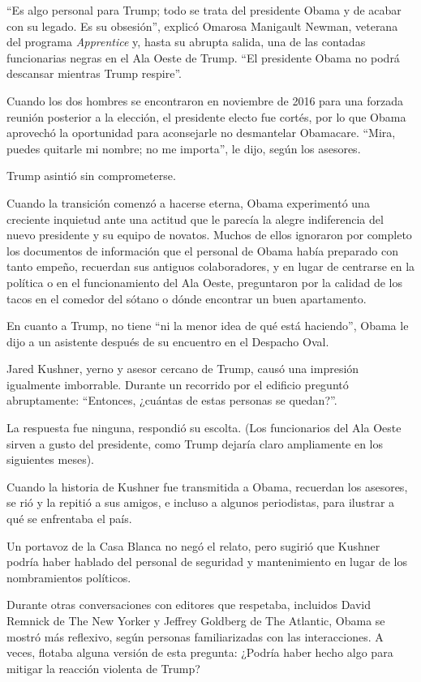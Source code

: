 ``Es algo personal para Trump; todo se trata del presidente Obama y de
acabar con su legado. Es su obsesión'', explicó Omarosa Manigault
Newman, veterana del programa \emph{Apprentice} y, hasta su abrupta
salida, una de las contadas funcionarias negras en el Ala Oeste de
Trump. ``El presidente Obama no podrá descansar mientras Trump
respire''.

Cuando los dos hombres se encontraron en noviembre de 2016 para una
forzada reunión posterior a la elección, el presidente electo fue
cortés, por lo que Obama aprovechó la oportunidad para aconsejarle no
desmantelar Obamacare. ``Mira, puedes quitarle mi nombre; no me
importa'', le dijo, según los asesores.

Trump asintió sin comprometerse.

Cuando la transición comenzó a hacerse eterna, Obama experimentó una
creciente inquietud ante una actitud que le parecía la alegre
indiferencia del nuevo presidente y su equipo de novatos. Muchos de
ellos ignoraron por completo los documentos de información que el
personal de Obama había preparado con tanto empeño, recuerdan sus
antiguos colaboradores, y en lugar de centrarse en la política o en el
funcionamiento del Ala Oeste, preguntaron por la calidad de los tacos en
el comedor del sótano o dónde encontrar un buen apartamento.

En cuanto a Trump, no tiene ``ni la menor idea de qué está haciendo'',
Obama le dijo a un asistente después de su encuentro en el Despacho
Oval.

Jared Kushner, yerno y asesor cercano de Trump, causó una impresión
igualmente imborrable. Durante un recorrido por el edificio preguntó
abruptamente: ``Entonces, ¿cuántas de estas personas se quedan?''.

La respuesta fue ninguna, respondió su escolta. (Los funcionarios del
Ala Oeste sirven a gusto del presidente, como Trump dejaría claro
ampliamente en los siguientes meses).

Cuando la historia de Kushner fue transmitida a Obama, recuerdan los
asesores, se rió y la repitió a sus amigos, e incluso a algunos
periodistas, para ilustrar a qué se enfrentaba el país.

Un portavoz de la Casa Blanca no negó el relato, pero sugirió que
Kushner podría haber hablado del personal de seguridad y mantenimiento
en lugar de los nombramientos políticos.

Durante otras conversaciones con editores que respetaba, incluidos David
Remnick de The New Yorker y Jeffrey Goldberg de The Atlantic, Obama se
mostró más reflexivo, según personas familiarizadas con las
interacciones. A veces, flotaba alguna versión de esta pregunta: ¿Podría
haber hecho algo para mitigar la reacción violenta de Trump?

